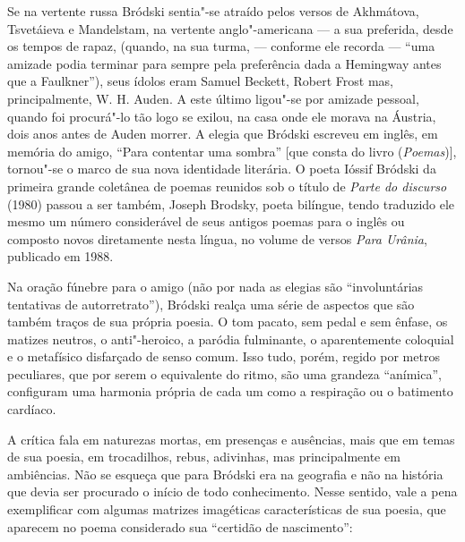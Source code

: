 Se na vertente russa Bródski sentia"-se atraído pelos versos de
Akhmátova, Tsvetáieva e Mandelstam, na vertente anglo"-americana --- a sua
preferida, desde os tempos de rapaz, (quando, na sua turma, --- conforme
ele recorda --- ``uma amizade podia terminar para sempre pela preferência
dada a Hemingway antes que a Faulkner''), seus ídolos eram Samuel
Beckett, Robert Frost mas, principalmente, W. H. Auden. A este último
ligou"-se por amizade pessoal, quando foi procurá"-lo tão logo se exilou,
na casa onde ele morava na Áustria, dois anos antes de Auden morrer. A
elegia que Bródski escreveu em inglês, em memória do amigo, ``Para
contentar uma sombra'' [que consta do livro \emph{ }
(\emph{Poemas})], tornou"-se o marco de sua nova identidade
literária. O poeta Ióssif Bródski da primeira grande coletânea de poemas
reunidos sob o título de \emph{Parte do discurso} (1980) passou a ser
também, Joseph Brodsky, poeta bilíngue, tendo traduzido ele mesmo um
número considerável de seus antigos poemas para o inglês ou composto
novos diretamente nesta língua, no volume de versos \emph{Para Urânia},
publicado em 1988.

Na oração fúnebre para o amigo (não por nada as elegias são
``involuntárias tentativas de autorretrato''), Bródski realça uma série
de aspectos que são também traços de sua própria poesia. O tom pacato,
sem pedal e sem ênfase, os matizes neutros, o anti"-heroico, a paródia
fulminante, o aparentemente coloquial e o metafísico disfarçado de senso
comum. Isso tudo, porém, regido por metros peculiares, que por serem o
equivalente do ritmo, são uma grandeza ``anímica'', configuram uma
harmonia própria de cada um como a respiração ou o batimento cardíaco.

A crítica fala em naturezas mortas, em presenças e ausências, mais que
em temas de sua poesia, em trocadilhos, rebus, adivinhas, mas
principalmente em ambiências. Não se esqueça que para Bródski era na
geografia e não na história que devia ser procurado o início de todo
conhecimento. Nesse sentido, vale a pena exemplificar com algumas
matrizes imagéticas características de sua poesia, que aparecem no poema
considerado sua ``certidão de nascimento'':

